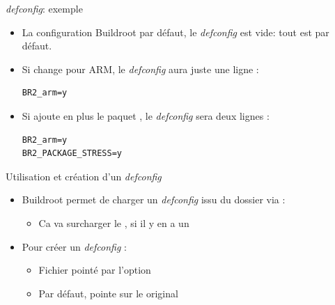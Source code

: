 \documentclass[aspectratio=169,obeyspaces,spaces,hyphens,dvipsnames]{beamer}
\begin{document}
\begin{frame}[fragile]{{\em defconfig}: exemple}
  \begin{itemize}
  \item La configuration Buildroot par défaut, le {\em defconfig}
    est vide: tout est par défaut.
  \item Si change pour ARM, le {\em defconfig} aura juste une ligne :
{\small
\begin{block}{}
\begin{verbatim}
BR2_arm=y
\end{verbatim}
\end{block}
}
\item Si ajoute en plus le paquet , le {\em defconfig}
  sera deux lignes :
{\small
\begin{block}{}
\begin{verbatim}
BR2_arm=y
BR2_PACKAGE_STRESS=y
\end{verbatim}
\end{block}
}
  \end{itemize}
\end{frame}

\begin{frame}{Utilisation et création d'un {\em defconfig}}
  \begin{itemize}
  \item Buildroot permet de charger un {\em defconfig} issu du dossier
     via :
    \begin{itemize}
    \item Ca va surcharger le , si il y en a un
    \end{itemize}
  \item Pour créer un {\em defconfig} :
    \begin{itemize}
    \item Fichier pointé par l'option 
    \item Par défaut, pointe sur le  original
    \end{itemize}
  \end{itemize}
\end{frame}
\end{document}
